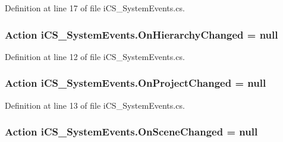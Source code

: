 Definition at line 17 of file i\+C\+S\+\_\+\+System\+Events.\+cs.

\hypertarget{classi_c_s___system_events_ac75646d6a6d6e3ae064d8624ae9c5375}{
\subsubsection[{On\+Hierarchy\+Changed}]{\setlength{\rightskip}{0pt plus 5cm}Action i\+C\+S\+\_\+\+System\+Events.\+On\+Hierarchy\+Changed = null\hspace{0.3cm}{\ttfamily [static]}}}\label{classi_c_s___system_events_ac75646d6a6d6e3ae064d8624ae9c5375}


Definition at line 12 of file i\+C\+S\+\_\+\+System\+Events.\+cs.

\hypertarget{classi_c_s___system_events_a57251f221e9d9b1c154ce7ceb60a0f8a}{
\subsubsection[{On\+Project\+Changed}]{\setlength{\rightskip}{0pt plus 5cm}Action i\+C\+S\+\_\+\+System\+Events.\+On\+Project\+Changed = null\hspace{0.3cm}{\ttfamily [static]}}}\label{classi_c_s___system_events_a57251f221e9d9b1c154ce7ceb60a0f8a}


Definition at line 13 of file i\+C\+S\+\_\+\+System\+Events.\+cs.

\hypertarget{classi_c_s___system_events_aa6e1d8e2332f39d8146bbd4812c876cd}{
\subsubsection[{On\+Scene\+Changed}]{\setlength{\rightskip}{0pt plus 5cm}Action i\+C\+S\+\_\+\+System\+Events.\+On\+Scene\+Changed = null\hspace{0.3cm}{\ttfamily [static]}}}\label{classi_c_s___system_events_aa6e1d8e2332f39d8146bbd4812c876cd}


